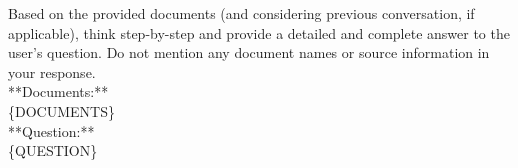 
\begin{tcolorbox}[
    enhanced,
    colback=white, %
    colframe=black, %
    arc=5mm, %
    boxrule=1pt,
    left=2mm, %
    right=2mm, %
    top=1mm, %
    bottom=1mm %
]

Based on the provided documents (and considering previous conversation, if applicable), think step-by-step and provide a detailed and complete answer to the user's question. Do not mention any document names or source information in your response.\\
 
**Documents:**\\
\{DOCUMENTS\}\\
 
**Question:**\\
\{QUESTION\}\\


\end{tcolorbox}